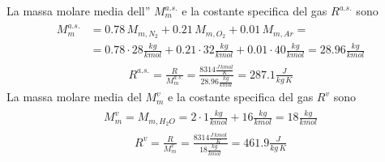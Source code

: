 \documentclass[letterpaper,10pt,italian]{jupyterBook}
\begin{document}
\sphinxAtStartPar
La massa molare media dell” \(M_m^{a.s.}\) e la costante specifica del gas \(R^{a.s.}\) sono
\begin{equation*}
\begin{split}\begin{aligned}
M_m^{a.s.}
  & = 0.78 \, M_{m, N_2} + 0.21 \, M_{m, O_2} + 0.01 \, M_{m, Ar} = \\ 
  & = 0.78 \cdot 28 \frac{kg}{kmol} + 0.21 \cdot 32 \frac{kg}{kmol} + 0.01 \cdot 40 \frac{kg}{kmol} = 28.96 \frac{kg}{kmol}
\end{aligned}\end{split}
\end{equation*}\begin{equation*}
\begin{split}R^{a.s.} = \frac{R}{M_m^{a.s.}} = \frac{8314 \frac{J \, kmol}{K}}{ 28.96 \frac{kg}{kmol} } = 287.1 \frac{J}{kg \, K}\end{split}
\end{equation*}
\sphinxAtStartPar
La massa molare media del  \(M_m^{v}\) e la costante specifica del gas \(R^{v}\) sono
\begin{equation*}
\begin{split}\begin{aligned}
M_m^{v} = M_{m, H_2 O} = 2 \cdot 1 \frac{kg}{kmol} + 16 \frac{kg}{kmol} = 18 \frac{kg}{kmol}
\end{aligned}\end{split}
\end{equation*}\begin{equation*}
\begin{split}R^{v} = \frac{R}{M_m^{v}} = \frac{8314 \frac{J \, kmol}{K}}{ 18 \frac{kg}{kmol} } = 461.9 \frac{J}{kg \, K}\end{split}
\end{equation*}
\end{document}
